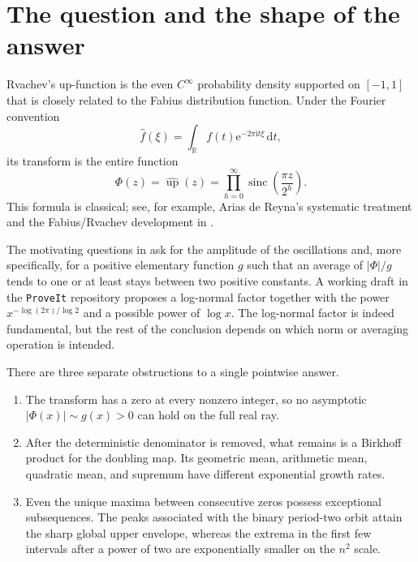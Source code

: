 \documentclass[11pt,oneside]{article}
\theoremstyle{definition}
\theoremstyle{remark}
\newcommand{\R}{\mathbb R}
\newcommand{\e}{\mathrm e}
\newcommand{\ii}{\mathrm i}
\newcommand{\dd}{\,\mathrm d}
\newcommand{\Up}{\operatorname{up}}
\newcommand{\sinc}{\operatorname{sinc}}
\newcommand{\Phiup}{\Phi}
\newcommand{\abs}[1]{\left|#1\right|}
\begin{document}
\tableofcontents
\newpage

\section{The question and the shape of the answer}
\label{sec:introduction}

Rvachev's up-function is the even $C^\infty$ probability density supported on $[-1,1]$
that is closely related to the Fabius distribution function.  Under the Fourier convention
\[
 \widehat f(\xi)=\int_{\R}f(t)\e^{-2\pi\ii t\xi}\dd t,
\]
its transform is the entire function
\begin{equation}
 \Phiup(z)=\widehat{\Up}(z)
 =\prod_{h=0}^{\infty}\sinc\!\left(\frac{\pi z}{2^h}\right).
 \label{eq:Phi-definition}
\end{equation}
This formula is classical; see, for example, Arias de Reyna's systematic treatment
\cite{arias1982} and the Fabius/Rvachev development in \cite{proveit}.

The motivating questions in \cite{mse-extrema,mse-decay} ask for the amplitude of the
oscillations and, more specifically, for a positive elementary function $g$ such that an
average of $\abs{\Phiup}/g$ tends to one or at least stays between two positive constants.
A working draft in the \texttt{ProveIt} repository \cite{decay-draft} proposes a log-normal
factor together with the power $x^{-\log(2\pi)/\log2}$ and a possible power of $\log x$.
The log-normal factor is indeed fundamental, but the rest of the conclusion depends on
which norm or averaging operation is intended.

There are three separate obstructions to a single pointwise answer.

\begin{enumerate}
\item The transform has a zero at every nonzero integer, so no asymptotic
      $\abs{\Phiup(x)}\sim g(x)>0$ can hold on the full real ray.
\item After the deterministic denominator is removed, what remains is a Birkhoff product
      for the doubling map.  Its geometric mean, arithmetic mean, quadratic mean, and
      supremum have different exponential growth rates.
\item Even the unique maxima between consecutive zeros possess exceptional subsequences.
      The peaks associated with the binary period-two orbit attain the sharp global upper
      envelope, whereas the extrema in the first few intervals after a power of two are
      exponentially smaller on the $n^2$ scale.
\end{enumerate}
\end{document}
